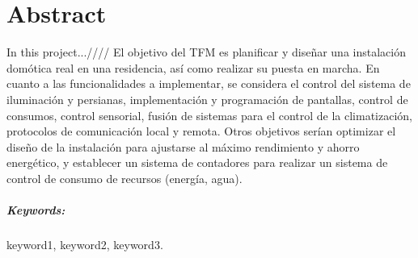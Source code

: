 
\chapter{Abstract}

In this project...////
El objetivo del TFM es planificar y diseñar una instalación domótica real en una residencia, así como realizar su puesta en marcha. En cuanto a las funcionalidades a implementar, se considera el control del sistema de iluminación y persianas, implementación y programación de pantallas, control de consumos, control sensorial, fusión de sistemas para el control de la climatización, protocolos de comunicación local y remota. Otros objetivos serían optimizar el diseño de la instalación para ajustarse al máximo rendimiento y ahorro energético, y establecer un sistema de contadores para realizar un sistema de control de consumo de recursos (energía, agua).

\paragraph{Keywords:} keyword1, keyword2, keyword3.